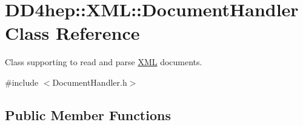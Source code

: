 \hypertarget{class_d_d4hep_1_1_x_m_l_1_1_document_handler}{}\section{D\+D4hep\+:\+:X\+ML\+:\+:Document\+Handler Class Reference}
\label{class_d_d4hep_1_1_x_m_l_1_1_document_handler}


Class supporting to read and parse \hyperlink{namespace_d_d4hep_1_1_x_m_l}{X\+ML} documents.  




{\ttfamily \#include $<$Document\+Handler.\+h$>$}

\subsection*{Public Member Functions}
